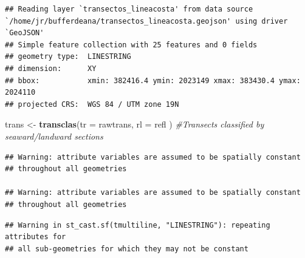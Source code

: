 \documentclass[11pt,]{article}
\newenvironment{Shaded}{\begin{snugshade}}{\end{snugshade}}
\newcommand{\KeywordTok}[1]{\textcolor[rgb]{0.13,0.29,0.53}{\textbf{#1}}}
\newcommand{\DataTypeTok}[1]{\textcolor[rgb]{0.13,0.29,0.53}{#1}}
\newcommand{\StringTok}[1]{\textcolor[rgb]{0.31,0.60,0.02}{#1}}
\newcommand{\CommentTok}[1]{\textcolor[rgb]{0.56,0.35,0.01}{\textit{#1}}}
\newcommand{\NormalTok}[1]{#1}
\begin{document}
\begin{verbatim}
## Reading layer `transectos_lineacosta' from data source `/home/jr/bufferdeana/transectos_lineacosta.geojson' using driver `GeoJSON'
## Simple feature collection with 25 features and 0 fields
## geometry type:  LINESTRING
## dimension:      XY
## bbox:           xmin: 382416.4 ymin: 2023149 xmax: 383430.4 ymax: 2024110
## projected CRS:  WGS 84 / UTM zone 19N
\end{verbatim}

\begin{Shaded}
\begin{Highlighting}[]
\NormalTok{trans <-}\StringTok{ }\KeywordTok{transclas}\NormalTok{(}\DataTypeTok{tr =}\NormalTok{ rawtrans, }\DataTypeTok{rl =}\NormalTok{ refl}
\NormalTok{                   ) }\CommentTok{#Transects classified by seaward/landward sections}
\end{Highlighting}
\end{Shaded}

\begin{verbatim}
## Warning: attribute variables are assumed to be spatially constant
## throughout all geometries

## Warning: attribute variables are assumed to be spatially constant
## throughout all geometries
\end{verbatim}

\begin{verbatim}
## Warning in st_cast.sf(tmultiline, "LINESTRING"): repeating attributes for
## all sub-geometries for which they may not be constant
\end{verbatim}
\end{document}
